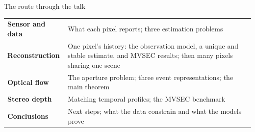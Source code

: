\begin{frame}{The route through the talk}
\renewcommand{\arraystretch}{1.6}
\begin{tabular}{>{\raggedright\arraybackslash}p{3.3cm}>{\raggedright\arraybackslash}p{10.1cm}}
\textbf{Sensor and data} & What each pixel reports; three estimation problems\\
\textbf{Reconstruction} & One pixel's history: the observation model, a unique and stable estimate, and MVSEC results; then many pixels sharing one scene\\
\textbf{Optical flow} & The aperture problem; three event representations; the main theorem\\
\textbf{Stereo depth} & Matching temporal profiles; the MVSEC benchmark\\
\textbf{Conclusions} & Next steps; what the data constrain and what the models prove\\
\end{tabular}
\end{frame}

